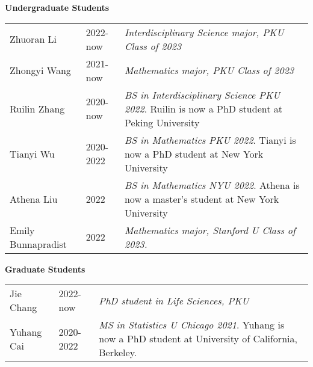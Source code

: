 \textbf{Undergraduate Students} 
\begin{tabular}{
  p{}%
  p{}%
  p{}%
  }
Zhuoran Li & 2022-now & \textit{Interdisciplinary Science major, PKU Class of 2023} \\
Zhongyi Wang & 2021-now & \textit{Mathematics major, PKU Class of 2023} \\
Ruilin Zhang & 2020-now & \textit{BS in Interdisciplinary Science PKU 2022}. Ruilin is now a PhD student at Peking University \\
Tianyi Wu & 2020-2022 & \textit{BS in Mathematics PKU 2022}. Tianyi is now a PhD student at New York University\\
Athena Liu & 2022 & \textit{BS in Mathematics NYU 2022}. Athena is now a master's student at New York University \\
Emily Bunnapradist & 2022 & \textit{Mathematics major, Stanford U Class of 2023.} 
\end{tabular}

\textbf{Graduate Students} 
\begin{tabular}{
  p{}%
  p{}%
  p{}%
  }
Jie Chang & 2022-now & \textit{PhD student in Life Sciences, PKU} \\
Yuhang Cai & 2020-2022 & \textit{MS in Statistics U Chicago 2021}. Yuhang is now a PhD student at University of California, Berkeley.
\end{tabular}

